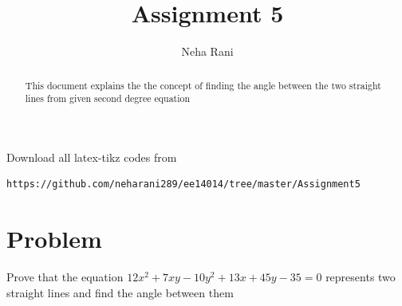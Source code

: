 \documentclass[journal,12pt,twocolumn]{IEEEtran}
\begin{document}
\makeatletter
{}
\makeatother
\let\StandardTheFigure\thefigure
\let\vec\mathbf
\renewcommand{\thefigure}{\theproblem}
\def\putbox#1#2#3{\makebox[0in][l]{\makebox[#1][l]{}\raisebox{\baselineskip}[0in][0in]{\raisebox{#2}[0in][0in]{#3}}}}
     \def\rightbox#1{\makebox[0in][r]{#1}}
     \def\centbox#1{\makebox[0in]{#1}}
     \def\topbox#1{\raisebox{-\baselineskip}[0in][0in]{#1}}
     \def\midbox#1{\raisebox{-0.5\baselineskip}[0in][0in]{#1}}
\vspace{3cm}
\title{Assignment 5}
\author{Neha Rani}
\maketitle
\newpage
\bigskip
\renewcommand{\thefigure}{\theenumi}
\renewcommand{\thetable}{\theenumi}
\begin{abstract}
This document explains the the concept of finding the angle between the two straight lines from given second degree equation 
\end{abstract}
Download all latex-tikz codes from 
\begin{lstlisting}
https://github.com/neharani289/ee14014/tree/master/Assignment5
\end{lstlisting}
\section{Problem}
Prove that the equation $12x^2+7xy-10y^2+13x+45y-35=0$ represents two straight lines and find the angle between them 
\end{document}
